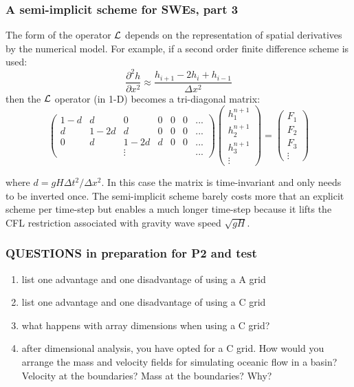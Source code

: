 \documentclass[xcolor=dvipsnames]{beamer} %
\newcommand{\BSS}{ \begin{scriptsize}}
\newcommand{\ESS}{ \end{scriptsize}}
\newcommand{\partd}[2]{\frac{\partial #1}{\partial #2}}
\begin{document}
\frame
{
	\frametitle{A semi-implicit scheme for SWEs, part 3}
	\BSS
The form of the operator $\cal{L}$ depends on the
representation of spatial derivatives by the numerical model. For
example, if a second order finite difference scheme is used:
\begin{equation}
	\partd{^2 h}{x^2}\approx \frac{h_{i+1}-2h_i+h_{i-1}}{\Delta x^2}
\end{equation}
then the $\cal{L}$ operator (in 1-D) becomes a tri-diagonal matrix:
\begin{equation}
	\left(
	\begin{array}{ccccccc}
		1-d & d & 0 & 0 & 0 & 0 & ... \\
		d & 1-2d & d & 0 & 0 & 0 & ... \\
		0 & d & 1-2d & d & 0 & 0 & ... \\
		& & \vdots & & & & ... 
	\end{array}
	\right) \left(
	\begin{array}{c}
		h^{n+1}_1 \\
		h^{n+1}_2 \\
		h^{n+1}_3 \\
		\vdots
	\end{array}
	\right) = \left(
	\begin{array}{c}
		F_1 \\
		F_2 \\
		F_3 \\
		\vdots
	\end{array}
	\right)
\end{equation}

where $d=gH\Delta t^2/\Delta x^2$. In this case the matrix is
time-invariant and only needs to be inverted once. The semi-implicit
scheme barely costs more that an explicit scheme per time-step but
enables a much longer time-step because it lifts the CFL restriction
associated with gravity wave speed $\sqrt{gH}$.
	
	\ESS
}

\frame
{
	\frametitle{QUESTIONS in preparation for P2 and test}
	\BSS
	\begin{enumerate}
		\item list one advantage and one disadvantage of using a A grid
		\item list one advantage and one disadvantage of using a C grid
		\item what happens with array dimensions when using a C grid?
		\item after dimensional analysis, you have opted for a C grid. How would you arrange the mass and velocity fields for simulating oceanic flow in a basin? Velocity at the boundaries? Mass at the boundaries? Why?
	\end{enumerate}
	\ESS
}
\end{document}
